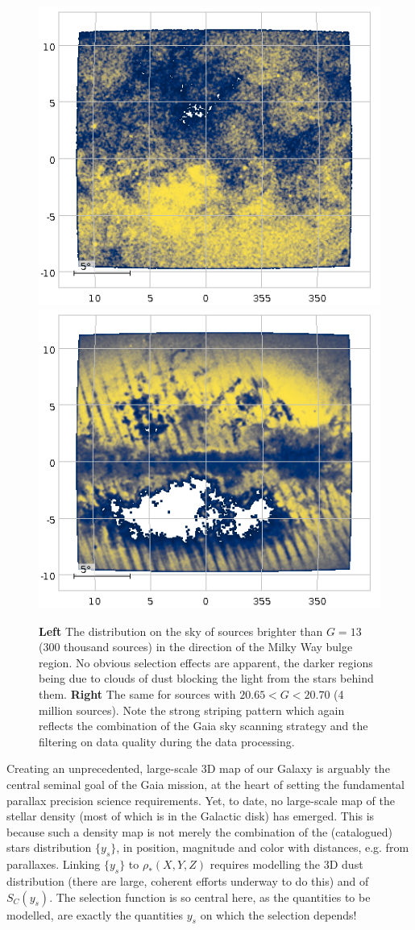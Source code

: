 \begin{figure}
    \centering
    \includegraphics[width=0.5\linewidth]{img/BulgeRegionGlt13.png}\hfil
    \includegraphics[width=0.5\linewidth]{img/BulgeRegionG20p65to20p70.png}
    \caption{\textbf{Left} The distribution on the sky of sources brighter than $G=13$ (300 thousand sources) in the direction of the Milky Way bulge region. No obvious selection effects are apparent, the darker regions being due to clouds of dust blocking the light from the stars behind them. \textbf{Right} The same for sources with $20.65<G<20.70$ (4 million sources). Note the strong striping pattern which again reflects the combination of the Gaia sky scanning strategy and the filtering on data quality during the data processing.}
    \label{fig:bulge}
\end{figure}

Creating an unprecedented, large-scale 3D map of our Galaxy is arguably the central seminal goal of the Gaia mission, at the heart of setting the fundamental parallax precision science requirements. Yet, to date, no large-scale map of the stellar density (most of which is in the Galactic disk) has emerged. This is because 
such a density map is not merely the combination of the (catalogued) stars distribution $\{y_s\}$, in position, magnitude and color with distances, e.g. from parallaxes. Linking $\{y_s\}$ to $\rho_*(X,Y,Z)$ requires modelling the 3D dust distribution (there are large, coherent efforts underway to do this) and of $S_C(y_s)$. The selection function is so central here, as the quantities to be modelled, are exactly the quantities $y_s$ on which the selection depends!
\\

